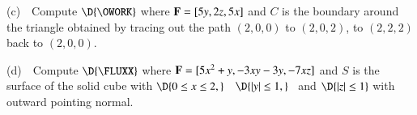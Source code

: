 \documentclass[11pt]{article}
\begin{document}
\vspace{6.0cm}

(c) \,\, Compute $\D{\OWORK}$ where ${\bf F} = [5y ,2z ,5x]$ and $C$ is the boundary around the triangle obtained by tracing out the path $(2,0,0)$ to $(2,0,2)$, to $(2,2,2)$ back to $(2,0,0)$. 

\vspace{4.8cm}

(d) \,\, Compute $\D{\FLUXX}$ where ${\bf F} = [5x^2+y ,-3xy-3y,-7xz]$ and $S$ is the surface of the solid cube with $\D{0 \le x \le 2,}$ \, $\D{ |y| \le 1,}$ \, and $\D{|z| \le 1}$ with outward pointing normal.

\thispagestyle{empty}
\newpage
\thispagestyle{empty}
	
\end{document}
